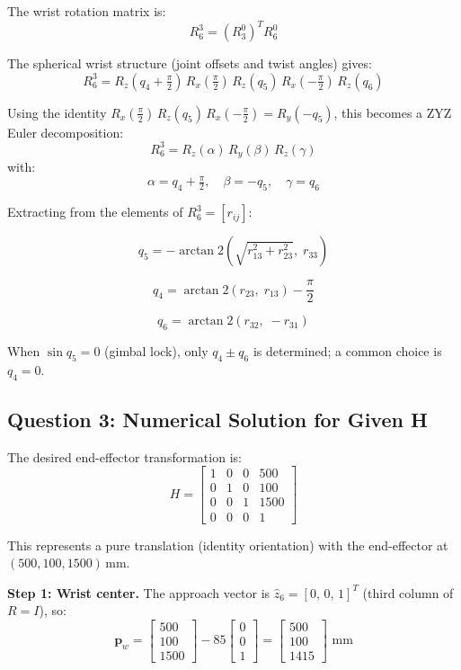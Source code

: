 \documentclass[12pt]{article}
\begin{document}
The wrist rotation matrix is:
\[
R_6^3 = \left(R_3^0\right)^T R_6^0
\]

The spherical wrist structure (joint offsets and twist angles)
gives:
\[
R_6^3 = R_z(q_4 + \tfrac{\pi}{2})\,R_x(\tfrac{\pi}{2})\,
         R_z(q_5)\,R_x(-\tfrac{\pi}{2})\,R_z(q_6)
\]

Using the identity $R_x(\tfrac{\pi}{2})\,R_z(q_5)\,R_x(-\tfrac{\pi}{2})
= R_y(-q_5)$, this becomes a ZYZ Euler decomposition:
\[
R_6^3 = R_z(\alpha)\,R_y(\beta)\,R_z(\gamma)
\]
with:
\[
\alpha = q_4 + \tfrac{\pi}{2}, \quad
\beta  = -q_5,                 \quad
\gamma = q_6
\]

Extracting from the elements of $R_6^3 = [r_{ij}]$:

\[
\boxed{q_5 = -\arctan 2\!\left(\sqrt{r_{13}^2 + r_{23}^2},\; r_{33}\right)}
\]

\[
\boxed{q_4 = \arctan 2(r_{23},\; r_{13}) - \frac{\pi}{2}}
\]

\[
\boxed{q_6 = \arctan 2(r_{32},\; -r_{31})}
\]

When $\sin q_5 = 0$ (gimbal lock), only $q_4 \pm q_6$ is
determined; a common choice is $q_4 = 0$.

\subsection{Question 3: Numerical Solution for Given H}

The desired end-effector transformation is:
\[
H = \begin{bmatrix}
1 & 0 & 0 & 500 \\
0 & 1 & 0 & 100 \\
0 & 0 & 1 & 1500 \\
0 & 0 & 0 & 1
\end{bmatrix}
\]

This represents a pure translation (identity orientation) with
the end-effector at $(500, 100, 1500)$\,mm.

\textbf{Step 1: Wrist center.}
The approach vector is $\hat{z}_6 = [0,\,0,\,1]^T$ (third column
of $R = I$), so:
\[
\mathbf{p}_w = \begin{bmatrix}500\\100\\1500\end{bmatrix}
             - 85\begin{bmatrix}0\\0\\1\end{bmatrix}
             = \begin{bmatrix}500\\100\\1415\end{bmatrix}\text{ mm}
\]
\end{document}
